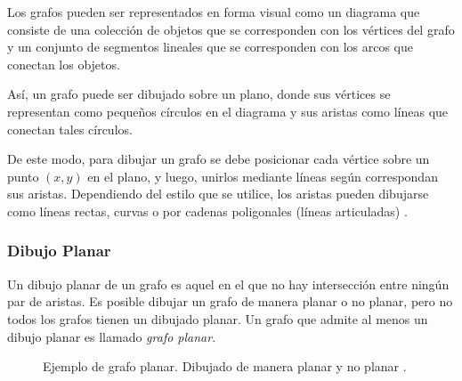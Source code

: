 Los grafos pueden ser representados en forma visual como un diagrama que consiste de una colección de objetos que se corresponden con los vértices del grafo y  un conjunto de segmentos lineales que se corresponden con los arcos que conectan los objetos.

Así, un grafo puede ser dibujado  sobre un plano, donde  sus vértices se representan como pequeños círculos en el diagrama y sus aristas como líneas que conectan tales círculos. 

De este modo, para dibujar un grafo se debe posicionar cada vértice sobre un punto $(x,y)$ en  el plano, y luego, unirlos mediante líneas según correspondan sus aristas. Dependiendo del estilo que se utilice,  los aristas pueden dibujarse como líneas rectas, curvas o por cadenas poligonales (líneas articuladas) \cite{nishizeki2004planar}.
 
\subsubsection{Dibujo Planar}
Un dibujo planar de un grafo es aquel en el que no hay intersección entre ningún par de aristas. Es posible dibujar un grafo de manera planar o no planar, pero no todos los grafos tienen un dibujado planar. Un grafo que admite al menos un dibujo planar es llamado {\em grafo planar}.

\begin{figure}
	\centering
	\caption{Ejemplo de grafo planar. Dibujado de manera planar y no planar \cite{nishizeki2004planar}.}
	\label{fig:ejemplo_dibujado_planar}
\end{figure}
